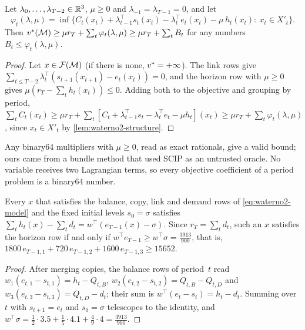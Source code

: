 \begin{proposition}\label{prop:waterno2-lagrangian}
Let $\lambda_0,\dots,\lambda_{T-2}\in\mathbb{R}^3$, $\mu\ge0$ and $\lambda_{-1}=\lambda_{T-1}=0$, and let
\[
\varphi_t(\lambda,\mu)=\inf\bigl\{C_t(x_t)+\lambda_{t-1}^{\top}s_t(x_t)-\lambda_t^{\top}e_t(x_t)-\mu\,h_t(x_t):\ x_t\in X'_t\bigr\}.
\]
Then $v^{*}(\mathcal{M})\ge\mu r_T+\sum_t\varphi_t(\lambda,\mu)\ge\mu r_T+\sum_tB_t$ for any numbers $B_t\le\varphi_t(\lambda,\mu)$.
\end{proposition}

\begin{proof}
Let $x\in\mathcal{F}(\mathcal{M})$ (if there is none, $v^{*}=+\infty$).
The link rows give $\sum_{t\le T-2}\lambda_t^{\top}(s_{t+1}(x_{t+1})-e_t(x_t))=0$, and the horizon row with $\mu\ge0$ gives $\mu(r_T-\sum_th_t(x_t))\le0$.
Adding both to the objective and grouping by period,
$\sum_tC_t(x_t)\ge\mu r_T+\sum_t[C_t+\lambda_{t-1}^{\top}s_t-\lambda_t^{\top}e_t-\mu h_t](x_t)\ge\mu r_T+\sum_t\varphi_t(\lambda,\mu)$, since $x_t\in X'_t$ by \cref{lem:waterno2-structure}.
\end{proof}

Any binary64 multipliers with $\mu\ge0$, read as exact rationals, give a valid bound; ours came from a bundle method that used SCIP as an untrusted oracle.
No variable receives two Lagrangian terms, so every objective coefficient of a period problem is a binary64 number.

\begin{lemma}\label{lem:waterno2-horizon}
Every $x$ that satisfies the balance, copy, link and demand rows of \eqref{eq:waterno2-model} and the fixed initial levels $s_0=\sigma$ satisfies $\sum_th_t(x)-\sum_td_t=w^{\top}(e_{T-1}(x)-\sigma)$.
Since $r_T=\sum_td_t$, such an $x$ satisfies the horizon row if and only if $w^{\top}e_{T-1}\ge w^{\top}\sigma=\tfrac{3913}{900}$, that is, $1800\,e_{T-1,1}+720\,e_{T-1,2}+1600\,e_{T-1,3}\ge15652$.
\end{lemma}

\begin{proof}
After merging copies, the balance rows of period~$t$ read $w_1(e_{t,1}-s_{t,1})=h_t-Q_{t,B}$, $w_2(e_{t,2}-s_{t,2})=Q_{t,B}-Q_{t,D}$ and $w_3(e_{t,3}-s_{t,3})=Q_{t,D}-d_t$; their sum is $w^{\top}(e_t-s_t)=h_t-d_t$.
Summing over~$t$ with $s_{t+1}=e_t$ and $s_0=\sigma$ telescopes to the identity, and $w^{\top}\sigma=\tfrac12\cdot3.5+\tfrac15\cdot4.1+\tfrac49\cdot4=\tfrac{3913}{900}$.
\end{proof}

